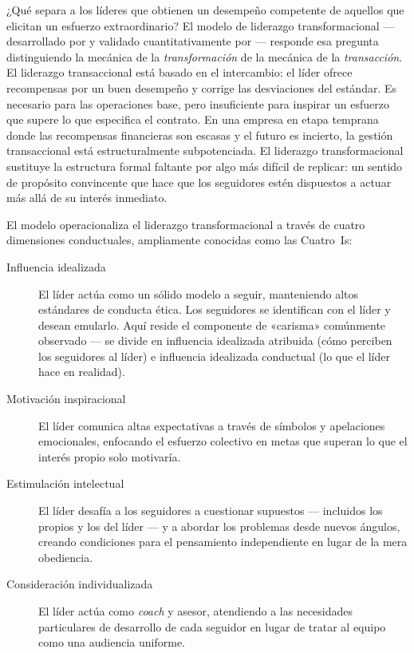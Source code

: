 ¿Qué separa a los líderes que obtienen un desempeño competente de aquellos que elicitan un
esfuerzo extraordinario? El modelo de liderazgo transformacional --- desarrollado por
\textcite{bass1985leadership} y validado cuantitativamente por \textcite{judge2004transformational}
--- responde esa pregunta distinguiendo la mecánica de la \emph{transformación} de la mecánica de
la \emph{transacción}. El liderazgo transaccional está basado en el intercambio: el líder ofrece
recompensas por un buen desempeño y corrige las desviaciones del estándar. Es necesario para las
operaciones base, pero insuficiente para inspirar un esfuerzo que supere lo que especifica el
contrato. En una empresa en etapa temprana donde las recompensas financieras son escasas y el
futuro es incierto, la gestión transaccional está estructuralmente subpotenciada. El liderazgo
transformacional sustituye la estructura formal faltante por algo más difícil de replicar: un
sentido de propósito convincente que hace que los seguidores estén dispuestos a actuar más allá
de su interés inmediato.

El modelo operacionaliza el liderazgo transformacional a través de cuatro dimensiones conductuales,
ampliamente conocidas como las Cuatro~Is:
\begin{description}
  \item[Influencia idealizada] El líder actúa como un sólido modelo a seguir, manteniendo altos
    estándares de conducta ética. Los seguidores se identifican con el líder y desean emularlo.
    Aquí reside el componente de «carisma» comúnmente observado --- se divide en influencia
    idealizada atribuida (cómo perciben los seguidores al líder) e influencia idealizada
    conductual (lo que el líder hace en realidad).
  \item[Motivación inspiracional] El líder comunica altas expectativas a través de símbolos y
    apelaciones emocionales, enfocando el esfuerzo colectivo en metas que superan lo que el
    interés propio solo motivaría.
  \item[Estimulación intelectual] El líder desafía a los seguidores a cuestionar supuestos ---
    incluidos los propios y los del líder --- y a abordar los problemas desde nuevos ángulos,
    creando condiciones para el pensamiento independiente en lugar de la mera obediencia.
  \item[Consideración individualizada] El líder actúa como \emph{coach} y asesor, atendiendo a
    las necesidades particulares de desarrollo de cada seguidor en lugar de tratar al equipo como
    una audiencia uniforme.
\end{description}

